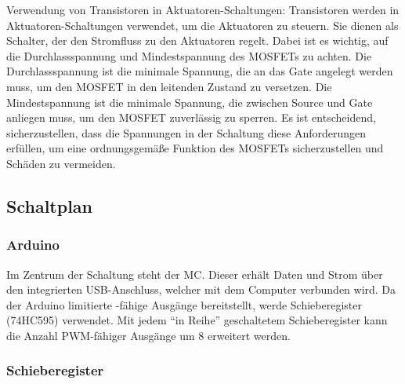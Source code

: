 Verwendung von Transistoren in Aktuatoren-Schaltungen: %
Transistoren werden in Aktuatoren-Schaltungen verwendet, um die Aktuatoren %
zu steuern. Sie dienen als Schalter, der den Stromfluss zu den Aktuatoren regelt.
Dabei ist es wichtig, auf die Durchlassspannung und Mindestspannung des MOSFETs zu achten. Die Durchlassspannung ist die
minimale Spannung, die an das Gate angelegt werden muss, um den MOSFET in den leitenden Zustand zu versetzen. Die
Mindestspannung ist die minimale Spannung, die zwischen Source und Gate anliegen muss, um den MOSFET zuverlässig zu
sperren.
Es ist entscheidend, sicherzustellen, dass die Spannungen in der Schaltung diese Anforderungen erfüllen, um
eine ordnungsgemäße Funktion des MOSFETs sicherzustellen und Schäden zu vermeiden. %


\subsection{Schaltplan} \label{subsec:schaltplan}

\subsubsection{Arduino}

Im Zentrum der Schaltung steht der \ac{MC}.
Dieser erhält Daten und Strom über den integrierten USB-Anschluss, welcher mit dem Computer verbunden wird.
Da der Arduino limitierte -fähige Ausgänge bereitstellt, werde Schieberegister (74HC595) verwendet. %
Mit jedem \enquote{in Reihe} geschaltetem Schieberegister kann die Anzahl \ac{PWM}-fähiger Ausgänge um 8 erweitert werden.

\subsubsection{Schieberegister}

